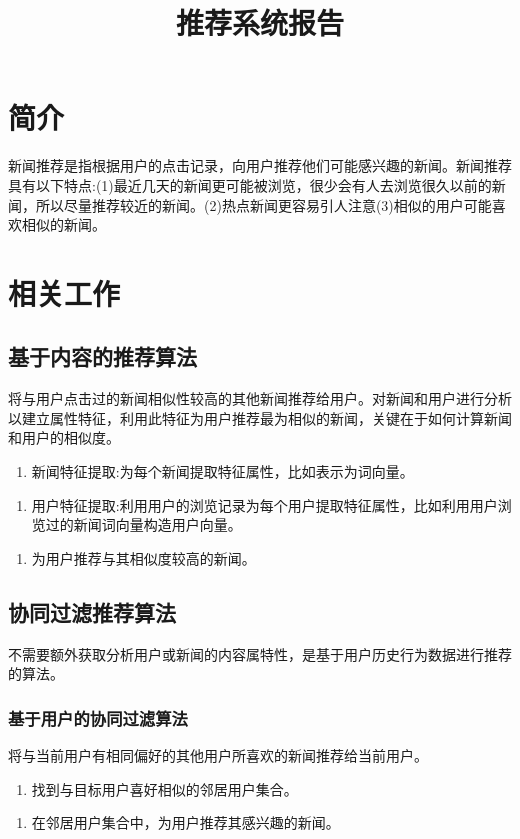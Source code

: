 \documentclass[UTF8]{article}
\begin{document}
\title{推荐系统报告}
\author{}
\date{}
\maketitle

\tableofcontents

\newpage
\section{简介}
	新闻推荐是指根据用户的点击记录，向用户推荐他们可能感兴趣的新闻。新闻推荐具有以下特点:(1)最近几天的新闻更可能被浏览，很少会有人去浏览很久以前的新闻，所以尽量推荐较近的新闻。(2)热点新闻更容易引人注意(3)相似的用户可能喜欢相似的新闻。
\section{相关工作}
\subsection{基于内容的推荐算法}
	将与用户点击过的新闻相似性较高的其他新闻推荐给用户。对新闻和用户进行分析以建立属性特征，利用此特征为用户推荐最为相似的新闻，关键在于如何计算新闻和用户的相似度。
	\begin{enumerate}{(1)}
		\item 新闻特征提取:为每个新闻提取特征属性，比如表示为词向量。
	\end{enumerate}
	\begin{enumerate}{(2)}
        \item 用户特征提取:利用用户的浏览记录为每个用户提取特征属性，比如利用用户浏览过的新闻词向量构造用户向量。
	\end{enumerate}
	\begin{enumerate}{(3)}
        \item 为用户推荐与其相似度较高的新闻。
	\end{enumerate}
\subsection{协同过滤推荐算法}
不需要额外获取分析用户或新闻的内容属特性，是基于用户历史行为数据进行推荐的算法。

\subsubsection{基于用户的协同过滤算法}
将与当前用户有相同偏好的其他用户所喜欢的新闻推荐给当前用户。
	\begin{enumerate}{(1)}
        \item 找到与目标用户喜好相似的邻居用户集合。
    \end{enumerate}
    \begin{enumerate}{(2)}
        \item 在邻居用户集合中，为用户推荐其感兴趣的新闻。
    \end{enumerate}
\end{document}
